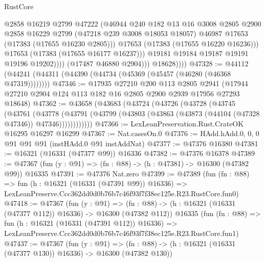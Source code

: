 \begin{lexlean}{RustCore}
\begin{coremodule}
                            @2858
                            @16219
                            @2799
                            @47222
                            (@46944
                              @240
                              @182
                              @13
                              @16
                              @3008
                              @2805
                              @2900
                              @2858
                              @16229
                              @2799
                              (@47218 @239 @3008 @18053 @18057)
                              @46987
                              @17653
                              (@17383 (@17655 @16230 @2805)))
                            @17653
                            (@17383 (@17655 @16220 @16236)))
                          @17653
                          (@17383 (@17655 @16177 @16237)))
                        @19181
                        @19184
                        @19187
                        @19191
                        @19196
                        @19202))))
                (@17487 @46880 @2904)))
            @18628))))
@47328 := @44112 (@44241 (@44311 (@44390 (@44734 (@45369 (@45457 (@46280 (@46368 @47319))))))))
@47346 := @17935
    @27210
    @200
    @113
    @2805
    @2941
    (@17944 @27210 @2904 @124 @113 @182 @16 @2805 @2900 @2939 @17956 @27293 @18648)
@47362 := @43658
    (@43683
      (@43724
        (@43726
          (@43728
            (@43745
              (@43761
                (@43778
                  (@43791
                    (@43799 (@43803 (@43863 (@43873 (@44104 (@47328 @47346)) @47346))))))))))))
@47366 := LexLeanPreservation.Rust.CrateOK @16295 @16297 @16299
@47367 := Nat.casesOn.{0}
@47376 := HAdd.hAdd.{0, 0, 0} @91 @91 @91 (instHAdd.{0} @91 instAddNat)
@47377 := @47376 @16380
@47381 := @16321 (@16331 (@47377 @99)) @16336
@47382 := @47376 @16378
@47389 := @47367 (fun (y : @91) => (fn : @88) -> (h : @47381) -> @16300 (@47382 @99)) @16335
@47391 := @47376 Nat.zero
@47399 := @47389
    (fun (fn : @88) =>
    fun (h : @16321 (@16331 (@47391 @99)) @16336) =>
    LexLeanPreserve.Ccc362dd0d0b76b7c46f93f7f38ec125e.R23.RustCore.fun0)
@47418 := @47367
    (fun (y : @91) =>
    (fn : @88) -> (h : @16321 (@16331 (@47377 @112)) @16336) -> @16300 (@47382 @112))
    @16335
    (fun (fn : @88) =>
    fun (h : @16321 (@16331 (@47391 @112)) @16336) =>
    LexLeanPreserve.Ccc362dd0d0b76b7c46f93f7f38ec125e.R23.RustCore.fun1)
@47437 := @47367
    (fun (y : @91) =>
    (fn : @88) -> (h : @16321 (@16331 (@47377 @130)) @16336) -> @16300 (@47382 @130))

\end{coremodule}
\end{lexlean}
